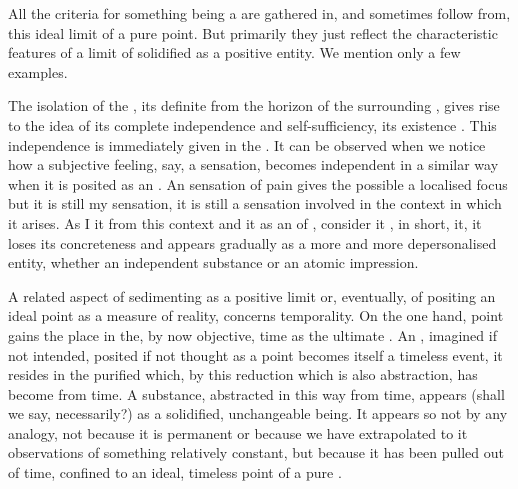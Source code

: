 \pa\label{pa:subIndependent}\label{pa:subUnchange}\label{pa:DescartesKnow}
All the criteria for something being a  are gathered in, and
sometimes follow from, this ideal limit of a pure point. But primarily they just
reflect the 
characteristic features of a limit of  solidified as a positive
entity. We mention only a few examples. 

The isolation of the , its definite  from the
horizon of the surrounding , gives rise to the idea of its complete
independence and self-sufficiency, its existence . This
independence is immediately given in the 
. It can be observed when we notice how a
{subjective} feeling, say, a sensation, becomes independent in a similar way
when it is posited as an . An  sensation of pain gives
the possible  a localised focus but it is still my sensation, it
is still a sensation involved in the context in which it arises. As I
 it from this context and  it as an 
of , consider it , in short,
 it, it loses its concreteness and appears gradually as a more
and more depersonalised  entity, whether an independent substance
or an atomic impression. 


A related aspect of sedimenting  as a positive
limit or, eventually, of positing an ideal point as a measure of 
reality, concerns temporality. On the one hand, point gains the place 
in the, by now objective, time as the ultimate .
An , imagined if not intended, posited if not thought as a point
becomes itself a timeless event, it resides in the purified  which, by
this reduction which is also abstraction, has become  from time.  A
substance, abstracted in this way from time, appears (shall we say,
necessarily?) as a solidified, unchangeable being.  It appears so not by any
analogy, not because it is permanent or because we have extrapolated to it
observations of something relatively constant, but because it has been pulled
out of time, confined to an ideal, timeless point of a pure .

